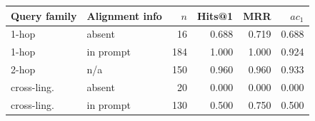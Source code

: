 {\setlength{\tabcolsep}{3pt}\small%
\begin{tabular}{llrrrr}
\toprule
Query family & Alignment info & $n$ & Hits@1 & MRR & $ac_1$ \\
\midrule
1-hop & absent & 16 & 0.688 & 0.719 & 0.688 \\
1-hop & in prompt & 184 & 1.000 & 1.000 & 0.924 \\
2-hop & n/a & 150 & 0.960 & 0.960 & 0.933 \\
cross-ling. & absent & 20 & 0.000 & 0.000 & 0.000 \\
cross-ling. & in prompt & 130 & 0.500 & 0.750 & 0.500 \\
\bottomrule
\end{tabular}}